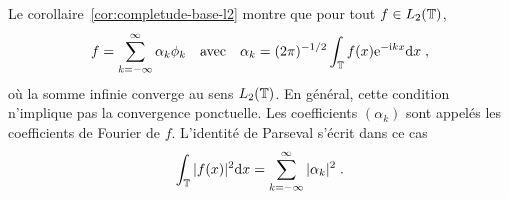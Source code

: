 %
%
%
Le corollaire~\ref{cor:completude-base-l2} montre que pour tout $f \in
L_2(\mathbb{T})$,
\[
f= \sum_{k=-\infty}^\infty \alpha_k \phi_k  \quad \text{avec}\quad
\alpha_k= (2 \pi)^{-1/2} \int_{\mathbb{T}} f(x) \mathrm{e}^{-\mathrm{i} k x} \mathrm{d} x \;,
\]
o\`{u} la somme infinie converge au sens $L_2(\mathbb{T})$. En g\'{e}n\'{e}ral, cette
condition n'implique pas la convergence ponctuelle. Les coefficients $(\alpha_k)$ sont appel\'{e}s les coefficients
de Fourier de $f$.  L'identit\'{e} de Parseval s'\'{e}crit dans ce cas
\[
\int_{\mathbb{T}} |f(x)|^2 \mathrm{d} x
= \sum_{k=-\infty}^\infty |\alpha_k|^2 \;.
\]


